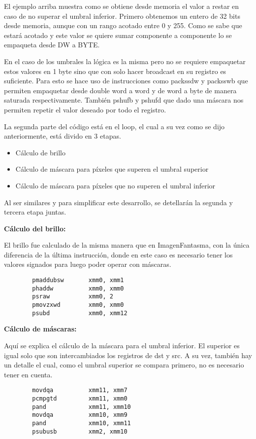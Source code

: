 \par El ejemplo arriba muestra como se obtiene desde memoria el valor a restar en caso de no superar el umbral inferior.
Primero obtenemos un entero de 32 bits desde memoria, aunque con un rango acotado entre 0 y 255. Como se sabe que estará acotado y este valor se quiere sumar componente a componente lo se empaqueta desde DW a BYTE.

\par En el caso de los umbrales la lógica es la misma pero no se requiere empaquetar estos valores en 1 byte sino que con solo hacer broadcast en su registro es suficiente.
Para esto se hace uso de instrucciones como packssdw y packsswb que permiten empaquetar desde double word a word y de word a byte de manera saturada respectivamente.
También pshufb y pshufd que dado una máscara nos permiten repetir el valor deseado por todo el registro.
\par La segunda parte del código está en el loop, el cual a su vez como se dijo anteriormente, está divido en 3 etapas.
\begin{itemize}
        \item Cálculo de brillo
        \item Cálculo de máscara para píxeles que superen el umbral superior
        \item Cálculo de máscara para píxeles que no superen el umbral inferior
\end{itemize}
\par Al ser similares y para simplificar este desarrollo, se detellarán la segunda y tercera etapa juntas.

\textbf{Cálculo del brillo:}
\par El brillo fue calculado de la misma manera que en ImagenFantasma, con la única diferencia de la última instrucción, donde en este caso es necesario
tener los valores signados para luego poder operar con máscaras.
\begin{codesnippet}
        \begin{verbatim}
        pmaddubsw       xmm0, xmm1    
        phaddw     	    xmm0, xmm0
        psraw      	    xmm0, 2 
        pmovzxwd        xmm0, xmm0 
        psubd           xmm0, xmm12  
	\end{verbatim}
\end{codesnippet}


\textbf{Cálculo de máscaras:}
\par Aquí se explica el cálculo de la máscara para el umbral inferior. El superior es igual solo que son intercambiados los registros de dst y src. A su vez, también hay un detalle el cual, como el umbral superior se compara primero, no es necesario tener en cuenta.
\begin{codesnippet}
        \begin{verbatim}
        movdqa      	xmm11, xmm7
        pcmpgtd     	xmm11, xmm0
        pand        	xmm11, xmm10 
        movdqa      	xmm10, xmm9
        pand        	xmm10, xmm11 
        psubusb     	xmm2, xmm10
	\end{verbatim}
\end{codesnippet}

